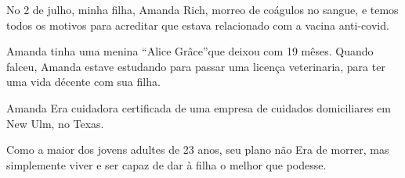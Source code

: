 No 2 de julho, minha filha, Amanda Rich, morreo de coágulos no sangue, e temos
todos os motivos para acreditar que estava relacionado com a vacina anti-covid.

Amanda tinha uma menina “Alice Grâce”que deixou com 19 mêses. Quando falceu,
Amanda estave estudando para passar uma licença veterinaria, para ter uma vida
décente com sua filha.

Amanda Era cuidadora certificada de uma empresa de cuidados domiciliares em New
Ulm, no Texas.

Como a maior dos jovens adultes de 23 anos, seu plano não Era de morrer, mas
simplemente viver e ser capaz de dar à filha o melhor que podesse.
